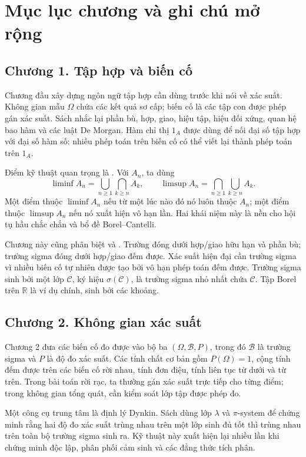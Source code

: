 \documentclass[11pt]{article}
\begin{document}
\section{Mục lục chương và ghi chú mở rộng}

\subsection*{Chương 1. Tập hợp và biến cố}

Chương đầu xây dựng ngôn ngữ tập hợp cần dùng trước khi nói về xác suất. Không
gian mẫu \(\Omega\) chứa các kết quả sơ cấp; biến cố là các tập con được phép
gán xác suất. Sách nhắc lại phần bù, hợp, giao, hiệu tập, hiệu đối xứng, quan
hệ bao hàm và các luật De Morgan. Hàm chỉ thị \(1_A\) được dùng để nối đại số
tập hợp với đại số hàm số: nhiều phép toán trên biến cố có thể viết lại thành
phép toán trên \(1_A\).

Điểm kỹ thuật quan trọng là . Với \(A_n\), ta dùng
\[
  \liminf A_n=\bigcup_{n\ge1}\bigcap_{k\ge n}A_k,\qquad
  \limsup A_n=\bigcap_{n\ge1}\bigcup_{k\ge n}A_k.
\]
Một điểm thuộc \(\liminf A_n\) nếu từ một lúc nào đó nó luôn thuộc \(A_n\);
một điểm thuộc \(\limsup A_n\) nếu nó xuất hiện vô hạn lần. Hai khái niệm này
là nền cho hội tụ hầu chắc chắn và bổ đề Borel--Cantelli.

Chương này cũng phân biệt  và . Trường đóng
dưới hợp/giao hữu hạn và phần bù; trường sigma đóng dưới hợp/giao đếm được.
Xác suất hiện đại cần trường sigma vì nhiều biến cố tự nhiên được tạo bởi vô
hạn phép toán đếm được. Trường sigma sinh bởi một lớp \(\mathcal{C}\), ký hiệu
\(\sigma(\mathcal{C})\), là trường sigma nhỏ nhất chứa \(\mathcal{C}\). Tập
Borel trên \(\mathbb{R}\) là ví dụ chính, sinh bởi các khoảng.

\subsection*{Chương 2. Không gian xác suất}

Chương 2 đưa các biến cố đo được vào bộ ba \((\Omega,\mathcal{B},P)\), trong
đó \(\mathcal{B}\) là trường sigma và \(P\) là độ đo xác suất. Các tính chất
cơ bản gồm \(P(\Omega)=1\), cộng tính đếm được trên các biến cố rời nhau, tính
đơn điệu, tính liên tục từ dưới và từ trên. Trong bài toán rời rạc, ta thường
gán xác suất trực tiếp cho từng điểm; trong không gian tổng quát, cần kiểm soát
lớp tập được phép đo.

Một công cụ trung tâm là định lý Dynkin. Sách dùng lớp \(\lambda\) và
\(\pi\)-system để chứng minh rằng hai độ đo xác suất trùng nhau trên một lớp
sinh đủ tốt thì trùng nhau trên toàn bộ trường sigma sinh ra. Kỹ thuật này xuất
hiện lại nhiều lần khi chứng minh độc lập, phân phối cảm sinh và các đẳng thức
tích phân.
\end{document}
